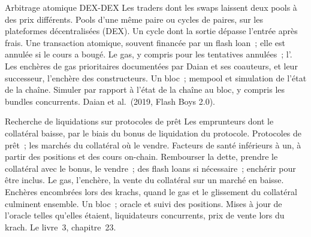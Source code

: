 \begin{strategyfile}{Arbitrage atomique DEX-DEX}\label{strat:hf:on-chain-trading:atomic}
 Les traders dont les swaps laissent deux pools à des prix différents.
 Pools d'une même paire ou cycles de paires, sur les plateformes décentralisées (DEX).
 Un cycle dont la sortie dépasse l'entrée après frais.
 Une transaction atomique, souvent financée par un flash loan~; elle est annulée si le cours a bougé.
 Le gas, y compris pour les tentatives annulées~; l'.
 Les enchères de gas prioritaires documentées par Daian et ses coauteurs, et leur successeur, l'enchère des constructeurs.
 Un bloc~; mempool et simulation de l'état de la chaîne.
 Simuler par rapport à l'état de la chaîne au bloc, y compris les bundles concurrents.
 Daian et al.\ (2019, Flash Boys 2.0).
\end{strategyfile}

\begin{strategyfile}{Recherche de liquidations sur protocoles de prêt}\label{strat:hf:on-chain-trading:liquidation}
 Les emprunteurs dont le collatéral baisse, par le biais du bonus de liquidation du protocole.
 Protocoles de prêt~; les marchés du collatéral où le vendre.
 Facteurs de santé inférieurs à un, à partir des positions et des cours on-chain.
 Rembourser la dette, prendre le collatéral avec le bonus, le vendre~; des flash loans si nécessaire~; enchérir pour être inclus.
 Le gas, l'enchère, la vente du collatéral sur un marché en baisse.
 Enchères encombrées lors des krachs, quand le gas et le glissement du collatéral culminent ensemble.
 Un bloc~; oracle et suivi des positions.
 Mises à jour de l'oracle telles qu'elles étaient, liquidateurs concurrents, prix de vente lors du krach.
 Le livre~3, chapitre~23.
\end{strategyfile}

